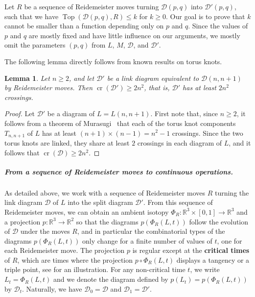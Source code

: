 \documentclass[10pt,a4paper]{amsart}
\newcommand{\R}{\mathbb{R}}
\newcommand{\cross}{\operatorname{cr}}
\newcommand{\addcross}{\operatorname{Top}}
\newtheorem{lemma}[theorem]{Lemma}
\begin{document}
Let $R$ be a sequence of Reidemeister moves turning $\mathcal{D}(p,q)$ into $\mathcal{D}'(p,q)$, such that we have $\addcross(\mathcal{D}(p,q),R) \leq k$ for $k \geq 0$. Our goal is to prove that $k$ cannot be smaller than a function depending only on $p$ and $q$. Since the values of $p$ and $q$ are mostly fixed and have little influence on our arguments, we mostly omit the parameters $(p,q)$ from $L$, $M$, $\mathcal{D}$, and $\mathcal{D}'$.

The following lemma directly follows from known results on torus knots.

\begin{lemma}\label{lem_min_cross_diag}
Let $n\geq 2$, and let $\mathcal{D}'$ be a link diagram equivalent to $\mathcal{D} (n,n+1)$ by Reidemeister moves. Then $\cross(\mathcal{D}') \geq 2n^2$, that is, $\mathcal{D}'$ has at least $2 n^2$ crossings.
\end{lemma}

\begin{proof}
Let $\mathcal{D}'$ be a diagram of $L=L(n,n+1)$. First note that, since $n\geq 2$, it follows from a theorem of Murasugi~\cite[Proposition 7.5]{Murasugi_crossings_torus} that each of the torus knot components $T_{n,n+1}$ of $L$ has at least $(n+1) \times (n-1) = n^2 -1$ crossings. Since the two torus knots are linked, they share at least $2$ crossings in each diagram of $L$, and it follows that $\cross(\mathcal{D}) \geq 2n^2$.
\end{proof}

\subparagraph*{From a sequence of Reidemeister moves to continuous operations.} As detailed above, we work with a sequence of Reidemeister moves $R$ turning the link diagram $\mathcal{D}$ of $L$ into the split diagram $\mathcal{D}'$. From this sequence of Reidemeister moves, we can obtain an ambient isotopy $\Phi_R : \R^3 \times [0,1] \to \R^3$ and a projection $p: \R^3 \rightarrow \R^2$ so that the diagrams $p(\Phi_R(L,t))$ follow the evolution of $\mathcal{D}$ under the moves $R$, and in particular the combinatorial types of the diagrams $p(\Phi_R(L,t))$ only change for a finite number of values of $t$, one for each Reidemeister move. The projection $p$ is regular except at the \textbf{critical times} of $R$, which are times where the projection $p \circ \Phi_R(L,t)$ displays a tangency or a triple point, see  for an illustration. 
For any non-critical time $t$, we write $L_t = \Phi_R(L,t)$ and we denote the diagram defined by $p(L_t) = p(\Phi_R(L,t))$ by $\mathcal{D}_t$. Naturally, we have $\mathcal{D}_0 = \mathcal{D}$ and $\mathcal{D}_1 = \mathcal{D}'$.
\end{document}
